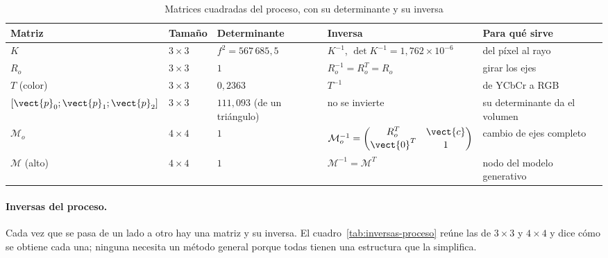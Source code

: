 \begin{table}[htbp]
\caption{Matrices cuadradas del proceso, con su determinante y su inversa}
\label{tab:cuadradas}
\centering\small
\begin{tabular}{@{}p{2.2cm}p{1.6cm}p{3.4cm}p{3.5cm}p{2.7cm}@{}}
\toprule
Matriz & Tamaño & Determinante & Inversa & Para qué sirve \\
\midrule
$K$ & $3\times3$ & $f^2=567\,685{,}5$ & $K^{-1}$, $\det K^{-1}=1{,}762\times10^{-6}$ & del píxel al rayo \\
$R_o$ & $3\times3$ & $1$ & $R_o^{-1}=R_o^{T}=R_o$ & girar los ejes \\
$T$ (color) & $3\times3$ & $0{,}2363$ & $T^{-1}$ & de YCbCr a RGB \\
$[\vect{p}_0;\vect{p}_1;\vect{p}_2]$ & $3\times3$ & $111{,}093$ (de un triángulo) & no se invierte & su determinante da el volumen \\
$\mathcal{M}_o$ & $4\times4$ & $1$ & $\mathcal{M}_o^{-1}=\begin{pmatrix}R_o^{T}&\vect{c}\\\vect{0}^{T}&1\end{pmatrix}$ & cambio de ejes completo \\
$\mathcal{M}$ (alto) & $4\times4$ & $1$ & $\mathcal{M}^{-1}=\mathcal{M}^{T}$ & nodo del modelo generativo \\
\bottomrule
\end{tabular}
\end{table}

\paragraph{Inversas del proceso.} Cada vez que se pasa de un lado a otro hay una matriz y su inversa. El cuadro~\ref{tab:inversas-proceso} reúne las de $3\times3$
y $4\times4$ y dice cómo se obtiene cada una; ninguna necesita un método general porque todas tienen una estructura que la simplifica.

